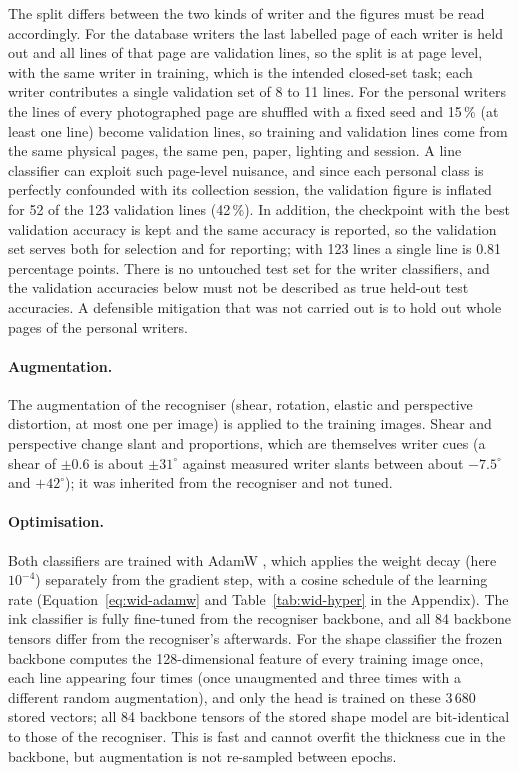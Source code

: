 The split differs between the two kinds of writer and the figures must be read accordingly.
For the database writers the last labelled page of each writer is held out and all lines of that page are validation lines, so the split is at page level, with the same writer in training, which is the intended closed-set task; each writer contributes a single validation set of 8 to 11 lines.
For the personal writers the lines of every photographed page are shuffled with a fixed seed and 15\,\% (at least one line) become validation lines, so training and validation lines come from the same physical pages, the same pen, paper, lighting and session.
A line classifier can exploit such page-level nuisance, and since each personal class is perfectly confounded with its collection session, the validation figure is inflated for 52 of the 123 validation lines (42\,\%).
In addition, the checkpoint with the best validation accuracy is kept and the same accuracy is reported, so the validation set serves both for selection and for reporting; with 123 lines a single line is 0.81 percentage points.
There is no untouched test set for the writer classifiers, and the validation accuracies below must not be described as true held-out test accuracies.
A defensible mitigation that was not carried out is to hold out whole pages of the personal writers.

\paragraph{Augmentation.}
The augmentation of the recogniser (shear, rotation, elastic and perspective distortion, at most one per image) is applied to the training images. Shear and perspective change slant and proportions, which are themselves writer cues (a shear of $\pm0.6$ is about $\pm31^\circ$ against measured writer slants between about $-7.5^\circ$ and $+42^\circ$); it was inherited from the recogniser and not tuned.

\paragraph{Optimisation.}
Both classifiers are trained with AdamW \cite{kingma2015,loshchilov2019}, which applies the weight decay (here $10^{-4}$) separately from the gradient step, with a cosine schedule of the learning rate (Equation~\ref{eq:wid-adamw} and Table~\ref{tab:wid-hyper} in the Appendix).
The ink classifier is fully fine-tuned from the recogniser backbone, and all 84 backbone tensors differ from the recogniser's afterwards.
For the shape classifier the frozen backbone computes the 128-dimensional feature of every training image once, each line appearing four times (once unaugmented and three times with a different random augmentation), and only the head is trained on these 3\,680 stored vectors; all 84 backbone tensors of the stored shape model are bit-identical to those of the recogniser.
This is fast and cannot overfit the thickness cue in the backbone, but augmentation is not re-sampled between epochs.


